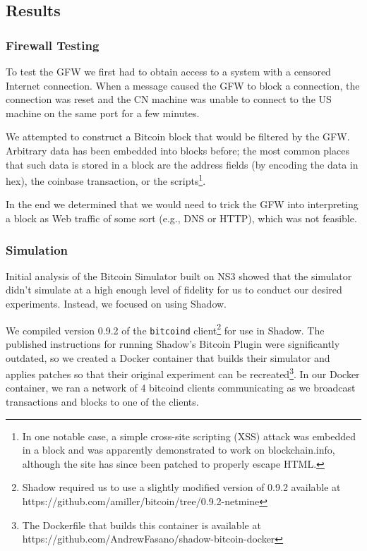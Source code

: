 \subsection{Results}

\subsubsection{Firewall Testing}
To test the GFW we first had to obtain access to a system with a censored Internet connection. When a message caused the GFW to block a connection, the connection was reset and the CN machine was unable to connect to the US machine on the same port for a few minutes.

We attempted to construct a Bitcoin block that would be filtered by the GFW. Arbitrary data has been embedded into blocks before; the most common places that such data is stored in a block are the address fields (by encoding the data in hex), the coinbase transaction, or the scripts\footnote{In one notable case, a simple cross-site scripting (XSS) attack was embedded in a block and was apparently demonstrated to work on blockchain.info\cite{reddit}, although the site has since been patched to properly escape HTML.}. 

In the end we determined that we would need to trick the GFW into interpreting a block as Web traffic of some sort (e.g., DNS or HTTP), which was not feasible.

\subsubsection{Simulation}
Initial analysis of the Bitcoin Simulator built on NS3 showed that the simulator didn't simulate at a high enough level of fidelity for us to conduct our desired experiments. Instead, we focused on using Shadow.

We compiled version 0.9.2 of the \texttt{bitcoind} client\footnote{Shadow required us to use a slightly modified version of 0.9.2 available at https://github.com/amiller/bitcoin/tree/0.9.2-netmine} for use in Shadow. The published instructions for running Shadow's Bitcoin Plugin were significantly outdated, so we created a Docker container that builds their simulator and applies patches so that their original experiment can be recreated\footnote{The Dockerfile that builds this container is available at https://github.com/AndrewFasano/shadow-bitcoin-docker}. In our Docker container, we ran a network of 4 bitcoind clients communicating as we broadcast transactions and blocks to one of the clients.

